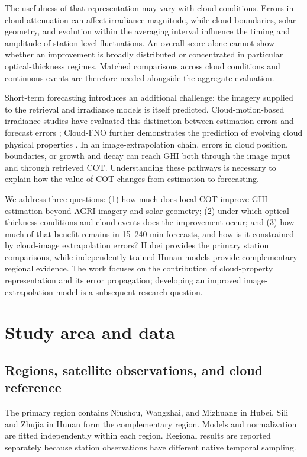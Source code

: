 \documentclass[11pt]{article}
\begin{document}
The usefulness of that representation may vary with cloud conditions. Errors in cloud attenuation can affect irradiance magnitude, while cloud boundaries, solar geometry, and evolution within the averaging interval influence the timing and amplitude of station-level fluctuations. An overall score alone cannot show whether an improvement is broadly distributed or concentrated in particular optical-thickness regimes. Matched comparisons across cloud conditions and continuous events are therefore needed alongside the aggregate evaluation.

Short-term forecasting introduces an additional challenge: the imagery supplied to the retrieval and irradiance models is itself predicted. Cloud-motion-based irradiance studies have evaluated this distinction between estimation errors and forecast errors \cite{pap2024}; Cloud-FNO further demonstrates the prediction of evolving cloud physical properties \cite{zhang2026}. In an image-extrapolation chain, errors in cloud position, boundaries, or growth and decay can reach GHI both through the image input and through retrieved COT. Understanding these pathways is necessary to explain how the value of COT changes from estimation to forecasting.

We address three questions: (1) how much does local COT improve GHI estimation beyond AGRI imagery and solar geometry; (2) under which optical-thickness conditions and cloud events does the improvement occur; and (3) how much of that benefit remains in 15--240 min forecasts, and how is it constrained by cloud-image extrapolation errors? Hubei provides the primary station comparisons, while independently trained Hunan models provide complementary regional evidence. The work focuses on the contribution of cloud-property representation and its error propagation; developing an improved image-extrapolation model is a subsequent research question.

\section{Study area and data}
\subsection{Regions, satellite observations, and cloud reference}
The primary region contains Niushou, Wangzhai, and Mizhuang in Hubei. Sili and Zhujia in Hunan form the complementary region. Models and normalization are fitted independently within each region. Regional results are reported separately because station observations have different native temporal sampling.
\end{document}
